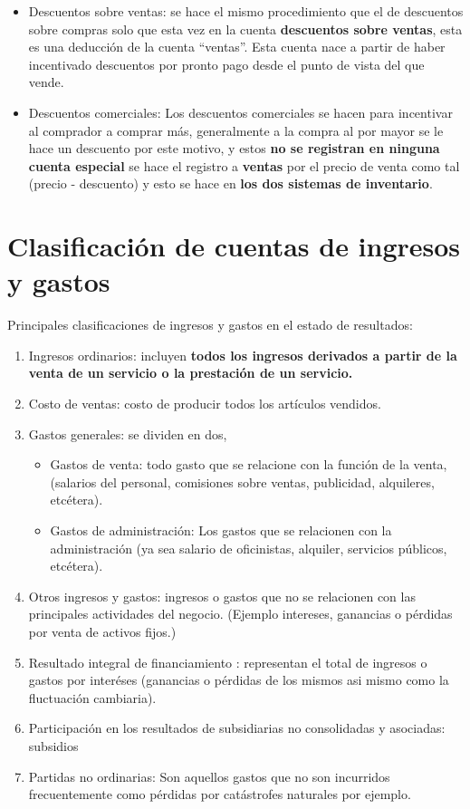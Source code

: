 \documentclass{article}
\begin{document}
\begin{itemize}
        \item Descuentos sobre ventas: se hace el mismo procedimiento que el de descuentos sobre compras solo que esta vez en la cuenta \textbf{descuentos sobre ventas}, esta es una deducción de la cuenta ``ventas''. Esta cuenta nace a partir de haber incentivado descuentos por pronto pago desde el punto de vista del que vende.

        
        \item Descuentos comerciales: Los descuentos comerciales se hacen para incentivar al comprador a comprar más, generalmente a la compra al por mayor se le hace un descuento por este motivo, y estos \textbf{no se registran en ninguna cuenta especial} se hace el registro a \textbf{ventas} por el precio de venta como tal (precio - descuento) y esto se hace en \textbf{los dos sistemas de inventario}.
\end{itemize}

\section{Clasificación de cuentas de ingresos y gastos}
Principales clasificaciones de ingresos y gastos en el estado de resultados:
\begin{enumerate}
    \item Ingresos ordinarios: incluyen \textbf{todos los ingresos derivados a partir de la venta de un servicio o la prestación de un servicio.}
    \item Costo de ventas: costo de producir todos los artículos vendidos.
    \item Gastos generales: se dividen en dos,
    \begin{itemize}
        \item Gastos de venta: todo gasto que se relacione con la función de la venta, (salarios del personal, comisiones sobre ventas, publicidad, alquileres, etcétera).
        \item Gastos de administración: Los gastos que se relacionen con la administración (ya sea salario de oficinistas, alquiler, servicios públicos, etcétera).
    \end{itemize}
    \item Otros ingresos y gastos: ingresos o gastos que no se relacionen con las principales actividades del negocio. (Ejemplo intereses, ganancias o pérdidas por venta de activos fijos.) 
    \item Resultado integral de financiamiento : representan el total de ingresos o  gastos por interéses (ganancias o pérdidas de los mismos asi mismo como la fluctuación cambiaria).
    \item Participación en los resultados de subsidiarias no consolidadas y asociadas: subsidios  
    \item Partidas no ordinarias: Son aquellos gastos que no son incurridos frecuentemente como pérdidas por catástrofes naturales por ejemplo.
\end{enumerate}
\end{document}
